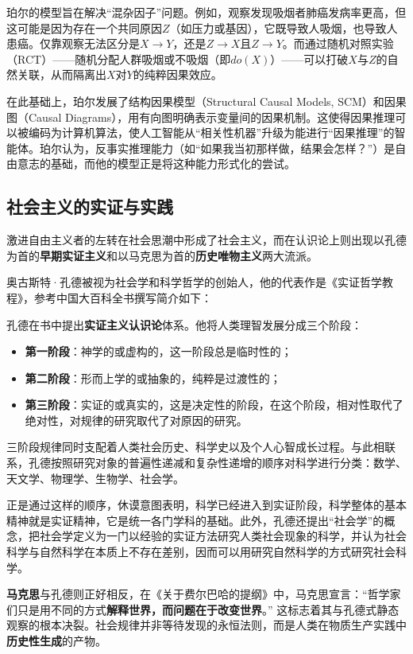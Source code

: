 珀尔的模型旨在解决“混杂因子”问题。例如，观察发现吸烟者肺癌发病率更高，但这可能是因为存在一个共同原因$Z$（如压力或基因），它既导致人吸烟，也导致人患癌。仅靠观察无法区分是$X \rightarrow Y$，还是$Z \rightarrow X$且$Z \rightarrow Y$。而通过随机对照实验（RCT）——随机分配人群吸烟或不吸烟（即$do(X)$）——可以打破$X$与$Z$的自然关联，从而隔离出$X$对$Y$的纯粹因果效应。

在此基础上，珀尔发展了结构因果模型（Structural Causal Models, SCM）和因果图（Causal Diagrams），用有向图明确表示变量间的因果机制。这使得因果推理可以被编码为计算机算法，使人工智能从“相关性机器”升级为能进行“因果推理”的智能体。珀尔认为，反事实推理能力（如“如果我当初那样做，结果会怎样？”）是自由意志的基础，而他的模型正是将这种能力形式化的尝试。

\subsection{社会主义的实证与实践}

激进自由主义者的左转在社会思潮中形成了社会主义，而在认识论上则出现以孔德为首的\textbf{早期实证主义}和以马克思为首的\textbf{历史唯物主义}两大流派。

奥古斯特·孔德被视为社会学和科学哲学的创始人，他的代表作是《实证哲学教程》，参考中国大百科全书撰写简介如下：\textsuperscript{\cite{9}}

孔德在书中提出\textbf{实证主义认识论}体系。他将人类理智发展分成三个阶段：

\begin{itemize}
    \item \textbf{第一阶段}：神学的或虚构的，这一阶段总是临时性的；
    \item \textbf{第二阶段}：形而上学的或抽象的，纯粹是过渡性的；
    \item \textbf{第三阶段}：实证的或真实的，这是决定性的阶段，在这个阶段，相对性取代了绝对性，对规律的研究取代了对原因的研究。
\end{itemize}

三阶段规律同时支配着人类社会历史、科学史以及个人心智成长过程。与此相联系，孔德按照研究对象的普遍性递减和复杂性递增的顺序对科学进行分类：数学、天文学、物理学、生物学、社会学。

正是通过这样的顺序，休谟意图表明，科学已经进入到实证阶段，科学整体的基本精神就是实证精神，它是统一各门学科的基础。此外，孔德还提出“社会学”的概念，把社会学定义为一门以经验的实证方法研究人类社会现象的科学，并认为社会科学与自然科学在本质上不存在差别，因而可以用研究自然科学的方式研究社会科学。

\textbf{马克思}与孔德则正好相反，在《关于费尔巴哈的提纲》中，马克思宣言：“哲学家们只是用不同的方式\textbf{解释世界，而问题在于改变世界}。”\textsuperscript{\cite{10}}
这标志着其与孔德式静态观察的根本决裂。社会规律并非等待发现的永恒法则，而是人类在物质生产实践中\textbf{历史性生成}的产物。

